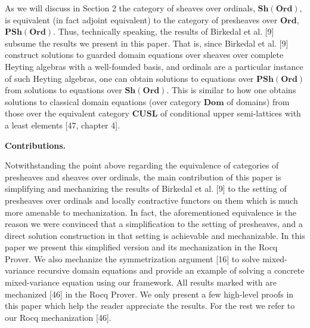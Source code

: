 \documentclass[10pt,a4paper]{article}
\begin{document}
 
As we will discuss in Section 2 the category of sheaves over ordinals, $\mathbf{Sh}(\mathbf{Ord})$, is equivalent (in fact adjoint equivalent) to the category of presheaves over $\mathbf{Ord}$, $\mathbf{PSh}(\mathbf{Ord})$. Thus, technically speaking, the results of Birkedal et al. [9] subsume the results we present in this paper. That is, since Birkedal et al. [9] construct solutions to guarded domain equations over sheaves over complete Heyting algebras with a well-founded basis, and ordinals are a particular instance of such Heyting algebras, one can obtain solutions to equations over $\mathbf{PSh}(\mathbf{Ord})$ from solutions to equations over $\mathbf{Sh}(\mathbf{Ord})$. This is similar to how one obtains solutions to classical domain equations (over category $\mathbf{Dom}$ of domains) from those over the equivalent category $\mathbf{CUSL}$ of conditional upper semi-lattices with a least elements [47, chapter 4].\par
 
 
 
 
\par\medskip\noindent\textbf{Contributions.}\par
 
 
Notwithstanding the point above regarding the equivalence of categories of presheaves and sheaves over ordinals, the main contribution of this paper is simplifying and mechanizing the results of Birkedal et al. [9] to the setting of presheaves over ordinals and locally contractive functors on them which is much more amenable to mechanization. In fact, the aforementioned equivalence is the reason we were convinced that a simplification to the setting of presheaves, and a direct solution construction in that setting is achievable and mechanizable. In this paper we present this simplified version and its mechanization in the Rocq Prover. We also mechanize the symmetrization argument [16] to solve mixed-variance recursive domain equations and provide an example of solving a concrete mixed-variance equation using our framework. All results marked with  are mechanized [46] in the Rocq Prover. We only present a few high-level proofs in this paper which help the reader appreciate the results. For the rest we refer to our Rocq mechanization [46].\par
 
\end{document}
